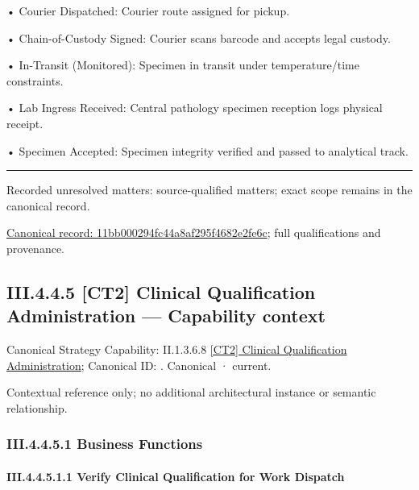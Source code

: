 •
Courier Dispatched: Courier route assigned for pickup.



•
Chain-of-Custody Signed: Courier scans barcode and accepts legal custody.



•
In-Transit (Monitored): Specimen in transit under temperature/time constraints.



•
Lab Ingress Received: Central pathology specimen reception logs physical receipt.



•
Specimen Accepted: Specimen integrity verified and passed to analytical track.



\medskip\hrule\medskip

{\small Recorded unresolved matters: source-qualified matters; exact scope remains in the canonical record.}\par
{\footnotesize \href{../../../../continuum/business/business-process/11bb000294fc44a8af295f4682e2fe6c.md}{Canonical record: 11bb000294fc44a8af295f4682e2fe6c}; full qualifications and provenance.}\par
\subsection*{III.4.4.5 [CT2] Clinical Qualification Administration — Capability context}
\label{navigation:III.4.4.5}

{\small Canonical Strategy Capability: II.1.3.6.8 \hyperref[element:0511a705d74a4f48a0ce92590ae764fa]{[CT2] Clinical Qualification Administration}; Canonical ID: \texttt{}. Canonical · current.}\par
Contextual reference only; no additional architectural instance or semantic relationship.\par
\subsubsection*{III.4.4.5.1 Business Functions}
\label{navigation:III.4.4.5.1}

\paragraph*{III.4.4.5.1.1 Verify Clinical Qualification for Work Dispatch}
\label{navigation:III.4.4.5.1.1}

